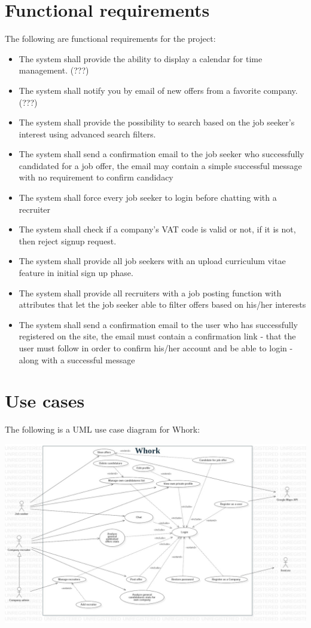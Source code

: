 \documentclass[12pt, a4paper]{article}
\begin{document}
\section{Functional requirements}
The following are functional requirements for the project:
\begin{itemize}
	\item The system shall provide the ability to display a calendar for time management. (???)
	\item The system shall notify you by email of new offers from a favorite company. (???)
	\item The system shall provide the possibility to search based on the job seeker's interest using advanced search filters.
	\item The system shall send a confirmation email to the job seeker who successfully candidated for a job offer, 
		the email may contain a simple successful message with no requirement to confirm candidacy
	\item The system shall force every job seeker to login before chatting with a recruiter
	\item The system shall check if a company's VAT code is valid or not, if it is not, then reject signup request.
	\item The system shall provide all job seekers with an upload curriculum vitae feature in initial sign up phase.
	\item The system shall provide all recruiters with a job posting function with attributes that let the job seeker 
		able to filter offers based on his/her interests
	\item The system shall send a confirmation email to the user who has successfully registered on the site, 
		the email must contain a confirmation link - that the user must follow in order to confirm his/her account 
		and be able to login - along with a successful message
\end{itemize}

\section{Use cases}
The following is a UML use case diagram for Whork:

\begin{center}
	\includegraphics[scale=1.7]{diagrams/project/usecase/usecase_scaled.jpg}
\end{center}
\end{document}
